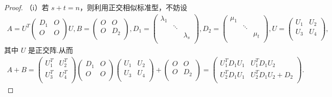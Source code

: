 \documentclass[../../main.tex]{subfiles}
\begin{document}
\begin{proof}
（i）若 $s+t=n$，则利用正交相似标准型，不妨设
\begin{align*}
A=U^T\begin{pmatrix}
D_1&		O\\
O&		O\\
\end{pmatrix} U,B=\begin{pmatrix}
O&		O\\
O&		D_2\\
\end{pmatrix},D_1=\begin{pmatrix}
\lambda _1&		&		\\
&		\ddots&		\\
&		&		\lambda _s\\
\end{pmatrix},D_2=\begin{pmatrix}
\mu _1&		&		\\
&		\ddots&		\\
&		&		\mu _t\\
\end{pmatrix},U=\begin{pmatrix}
U_1&		U_2\\
U_3&		U_4\\
\end{pmatrix},
\end{align*}
其中 $U$ 是正交阵.从而
\begin{align*}
A+B=\begin{pmatrix}
U_{1}^{T}&		U_{2}^{T}\\
U_{3}^{T}&		U_{4}^{T}\\
\end{pmatrix} \begin{pmatrix}
D_1&		O\\
O&		O\\
\end{pmatrix} \begin{pmatrix}
U_1&		U_2\\
U_3&		U_4\\
\end{pmatrix} +\begin{pmatrix}
O&		O\\
O&		D_2\\
\end{pmatrix} =\begin{pmatrix}
U_{1}^{T}D_1U_1&		U_{1}^{T}D_1U_2\\
U_{2}^{T}D_1U_1&		U_{2}^{T}D_1U_2+D_2\\
\end{pmatrix}.
\end{align*}

\end{proof}
\end{document}
